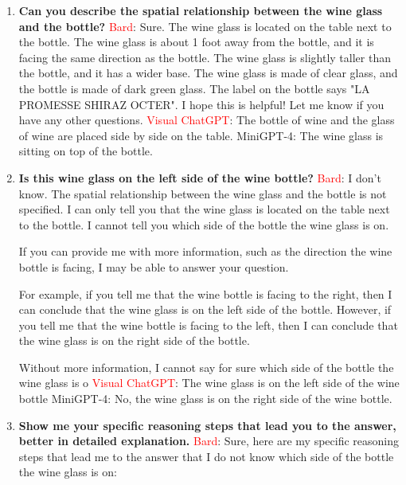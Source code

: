     \begin{enumerate}
        \item \textbf{Can you describe the spatial relationship between the wine glass and the bottle?}
        \subitem \textcolor{Red}{Bard}: 
        Sure. The wine glass is located on the table next to the bottle. The wine glass is about 1 foot away from the bottle, and it is facing the same direction as the bottle. The wine glass is slightly taller than the bottle, and it has a wider base. The wine glass is made of clear glass, and the bottle is made of dark green glass. The label on the bottle says "LA PROMESSE SHIRAZ OCTER".
        I hope this is helpful! Let me know if you have any other questions.       
        \subitem \textcolor{red}{Visual ChatGPT}: The bottle of wine and the glass of wine are placed side by side on the table.
        \subitem MiniGPT-4: The wine glass is sitting on top of the bottle.
        \item \textbf{Is this wine glass on the left side of the wine bottle?}
        \subitem \textcolor{Red}{Bard}: 
        I don't know. The spatial relationship between the wine glass and the bottle is not specified. I can only tell you that the wine glass is located on the table next to the bottle. I cannot tell you which side of the bottle the wine glass is on.
        
        If you can provide me with more information, such as the direction the wine bottle is facing, I may be able to answer your question.
        
        For example, if you tell me that the wine bottle is facing to the right, then I can conclude that the wine glass is on the left side of the bottle. However, if you tell me that the wine bottle is facing to the left, then I can conclude that the wine glass is on the right side of the bottle.
        
        Without more information, I cannot say for sure which side of the bottle the wine glass is o
        \subitem \textcolor{red}{Visual ChatGPT}: The wine glass is on the left side of the wine bottle
        \subitem MiniGPT-4: No, the wine glass is on the right side of the wine bottle.
        \item \textbf{Show me your specific reasoning steps that lead you to the answer, better in detailed explanation.}
        \subitem \textcolor{Red}{Bard}: 
        Sure, here are my specific reasoning steps that lead me to the answer that I do not know which side of the bottle the wine glass is on:
        

\end{enumerate}
